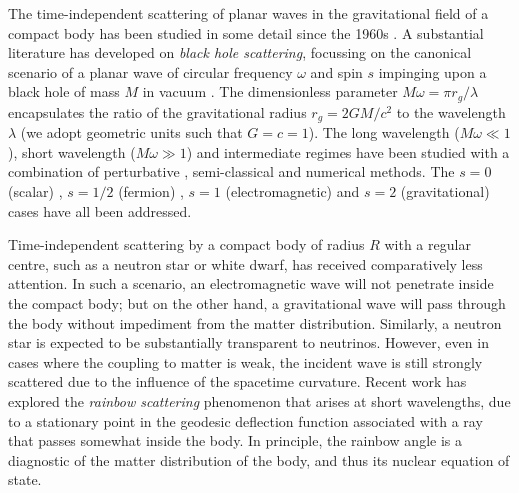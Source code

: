 \documentclass[aps,prd,longbibliography,reprint,twocolumn,amsmath,amssymb,amsfonts,showpacs,superscriptaddress]{revtex4-1}%
\begin{document}
The time-independent scattering of planar waves in the gravitational field of a compact body has been studied in some detail since the 1960s \cite{Hildreth1964PhDT64, Matzner:1968, Vishveshwara:1970}. A substantial literature has developed on \emph{black hole scattering}, focussing on the canonical scenario of a planar wave of circular frequency $\omega$ and spin $s$ \cite{Chrzanowski:1976jb} impinging upon a black hole of mass $M$ in vacuum \cite{Hildreth1964PhDT64, Matzner:1968, Vishveshwara:1970, Mashhoon:1973zz,Fabbri:1975,Sanchez:1977vz,MatznerRyan1978,Handler:1980un,Matzner:1985rjn,Futterman:1988ni,Andersson:1995vi,Glampedakis:2001cx,Dolan:2006vj,Dolan:2007ut,Dolan:2008kf,Crispino:2009xt,Cotaescu:2014jca,Gussmann:2016mkp}. The dimensionless parameter
$
M \omega = \pi r_g / \lambda
$
encapsulates the ratio of the gravitational radius $r_g = 2GM/c^2$ to the wavelength $\lambda$ (we adopt geometric units such that $G=c=1$). The long wavelength ($M \omega \ll 1$), short wavelength ($M \omega \gg 1$) and intermediate regimes have been studied with a combination of perturbative \cite{DeLogi:1977dp,Dolan:2007ut,Guadagnini:2008ha,Sorge:2015yoa}, semi-classical \cite{Matzner:1985rjn, Anninos:1992ih} and numerical methods. The $s = 0$ (scalar) \cite{Matzner:1968,Sanchez:1977vz,Andersson:1995vi,Glampedakis:2001cx,Leite:2019eis}, $s=1/2$ (fermion) \cite{Dolan:2006vj,Cotaescu:2014jca}, $s=1$ (electromagnetic) \cite{Fabbri:1975, Crispino:2009xt, Crispino:2015gua} and $s=2$ (gravitational) cases \cite{MatznerRyan1978,Handler:1980un,Dolan:2008kf} have all been addressed.

Time-independent scattering by a compact body of radius $R$ with a regular centre, such as a neutron star or white dwarf, has received comparatively less attention. In such a scenario, an electromagnetic wave will not penetrate inside the compact body; but on the other hand, a gravitational wave will pass through the body without impediment from the matter distribution. Similarly, a neutron star is expected to be substantially transparent to neutrinos. However, even in cases where the coupling to matter is weak, the incident wave is still strongly scattered due to the influence of the spacetime curvature. Recent work \cite{Dolan:2017rtj, Stratton:2019deq} has explored the \emph{rainbow scattering} phenomenon that arises at short wavelengths, due to a stationary point in the geodesic deflection function associated with a ray that passes somewhat inside the body. In principle, the rainbow angle is a diagnostic of the matter distribution of the body, and thus its nuclear equation of state. 
\end{document}

